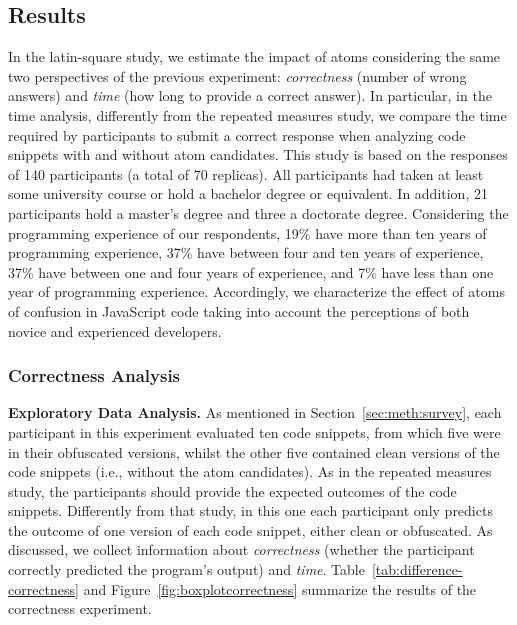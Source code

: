 
\subsection{Results}\label{sec:latin}

In the latin-square study, we estimate the impact of atoms considering the same two perspectives of the previous experiment: \emph{correctness} (number of wrong answers)
and \emph{time} (how long to provide a correct answer). In particular, in the time analysis, differently from the repeated  measures study, we compare the time required by participants to submit a correct response when analyzing code snippets with and without atom candidates. This study is based on the responses of 140 participants (a total of 70 replicas). All participants had taken at least some university course or hold a bachelor degree or equivalent. In addition, 21 participants hold a master's degree and three a doctorate degree. Considering the programming experience of our respondents, 19\% have more than ten years of programming experience, 37\% have between four and ten years of experience, 37\% have between one and four years of experience, and 7\% have less than one year of programming experience.  
Accordingly, we characterize the effect of atoms of confusion in JavaScript code taking into account the perceptions of both novice and experienced developers. 

\subsubsection{Correctness Analysis}

{\bf Exploratory Data Analysis.}
As mentioned in Section~\ref{sec:meth:survey}, each participant in this experiment evaluated ten code snippets, from which five were in their obfuscated versions, whilst the other five contained clean versions of the code snippets (i.e., without the atom candidates). As in the repeated measures study, the participants should provide the expected outcomes of the code snippets. Differently from that study, in this one each participant only predicts the outcome of one version of each code snippet, either clean or obfuscated. As discussed, we collect information about \emph{correctness} (whether the participant correctly predicted the program's output) and \emph{time}. 
Table~\ref{tab:difference-correctness} and Figure~\ref{fig:boxplotcorrectness} summarize the results of the correctness experiment.

